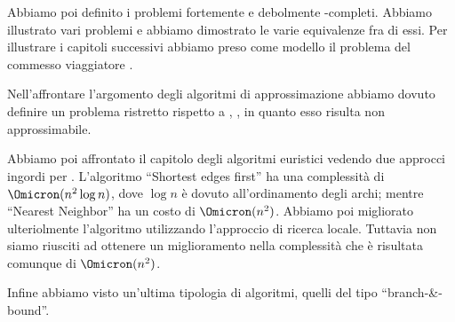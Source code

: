 Abbiamo poi definito i problemi fortemente e debolmente {\NP}-completi.
Abbiamo illustrato vari problemi e abbiamo dimostrato le varie equivalenze fra di essi.
Per illustrare i capitoli successivi abbiamo preso come modello il problema del commesso viaggiatore {\tsp}.

Nell'affrontare l'argomento degli algoritmi di approssimazione abbiamo dovuto definire un problema ristretto rispetto a {\tsp}, {\deltaTsp}, in quanto esso risulta non approssimabile.

Abbiamo poi affrontato il capitolo degli algoritmi euristici vedendo due approcci ingordi per {\tsp}.
L'algoritmo \enquote{Shortest edges first} ha una complessità di \(\Omicron(n^2 \log n)\), dove \(\log n\) è dovuto all'ordinamento degli archi; mentre \enquote{Nearest Neighbor} ha un costo di \(\Omicron(n^2)\).
Abbiamo poi migliorato ulteriolmente l'algoritmo utilizzando l'approccio di ricerca locale.
Tuttavia non siamo riusciti ad ottenere un miglioramento nella complessità che è risultata comunque di \(\Omicron(n^2)\).

Infine abbiamo visto un'ultima tipologia di algoritmi, quelli del tipo \enquote{branch-\&-bound}.

\ifsubfile

\fi
